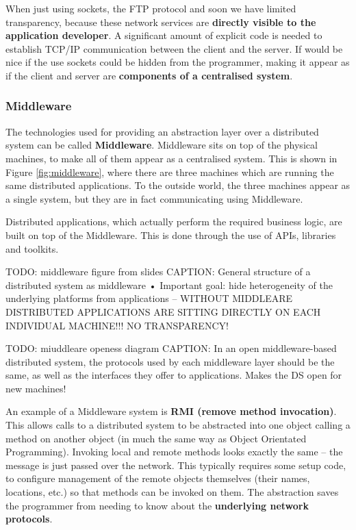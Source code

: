 \documentclass{article}
\begin{document}
When just using sockets, the FTP protocol and soon we have limited transparency, because these network services are \textbf{directly visible to the application developer}. A significant amount of explicit code is needed to establish TCP/IP communication between the client and the server. If would be nice if the use sockets could be hidden from the programmer, making it appear as if the client and server are \textbf{components of a centralised system}.

\subsubsection{Middleware}

The technologies used for providing an abstraction layer over a distributed system can be called \textbf{Middleware}. Middleware sits on top of the physical machines, to make all of them appear as a centralised system. This is shown in Figure \ref{fig:middleware}, where there are three machines which are running the same distributed applications. To the outside world, the three machines appear as a single system, but they are in fact communicating using Middleware.

Distributed applications, which actually perform the required business logic, are built on top of the Middleware. This is done through the use of APIs, libraries and toolkits.

TODO: middleware figure from slides
CAPTION: General structure of a distributed system as middleware 
• Important goal: hide heterogeneity of the underlying 
platforms from applications -- WITHOUT MIDDLEARE DISTRIBUTED APPLICATIONS ARE SITTING DIRECTLY ON EACH INDIVIDUAL MACHINE!!! NO TRANSPARENCY!

TODO: miuddleare openess diagram
CAPTION: In an open middleware-based distributed system, the 
protocols used by each middleware layer should be the 
same, as well as the interfaces they offer to applications. Makes the DS open for new machines!

An example of a Middleware system is \textbf{RMI (remove method invocation)}. This allows calls to a distributed system to be abstracted into one object calling a method on another object (in much the same way as Object Orientated Programming). Invoking local and remote methods looks exactly the same -- the message is just passed over the network. This typically requires some setup code, to configure management of the remote objects themselves (their names, locations, etc.) so that methods can be invoked on them. The abstraction saves the programmer from needing to know about the \textbf{underlying network protocols}.
\end{document}

